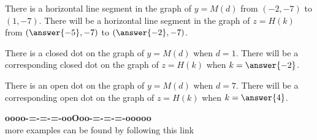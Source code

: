 \documentclass{ximera}
\begin{document}
\begin{example}
\begin{question}
\end{question}


\begin{question}

There is a horizontal line segment in the graph of $y = M(d)$ from $(-2, -7)$ to $(1, -7)$.  There will be a horizontal line segment in the graph of $z = H(k)$ from $\left(\answer{-5}, -7\right)$ to $\left(\answer{-2}, -7\right)$.

\end{question}



\begin{question}

There is a closed dot on the graph of $y= M(d)$  when $d = 1$.  There will be a corresponding closed dot on the graph of $z = H(k)$ when $k = \answer{-2}$. 


There is an open dot on the graph of $y= M(d)$  when $d = 7$.  There will be a corresponding open dot on the graph of $z = H(k)$ when $k = \answer{4}$.

\end{question}




\end{example}


























\begin{center}
\textbf{\textcolor{green!50!black}{oooo-=-=-=-ooOoo-=-=-=-ooooo}} \\

more examples can be found by following this link\\ 

\end{center}
\end{document}
